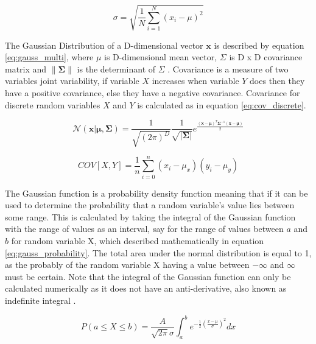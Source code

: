 \begin{equation}
  \sigma = \sqrt{\frac{1}{N}\sum_{i=1}^{N}(x_i - \mu)^2}
  \label{eq:standard_deviation}
\end{equation}

The Gaussian Distribution of a D-dimensional vector $\boldsymbol{x}$ is described by equation \ref{eq:gauss_multi}, where \textbf{$\mu$} is D-dimensional mean vector, \textbf{$\Sigma$} is D x D covariance matrix and $\|\boldsymbol{\Sigma}\|$ is the determinant of \textbf{$\Sigma$} \cite{patterns_machine_learning}. Covariance is a measure of two variables joint variability, if variable $X$ increases when variable $Y$ does then they have a positive covariance, else they have a negative covariance. Covariance for discrete random variables $X$ and $Y$ is calculated as in equation \ref{eq:cov_discrete}.

\begin{equation}
  \mathcal{N}(\boldsymbol{x}|\boldsymbol{\mu},\boldsymbol{\Sigma}) = \frac{1}{\sqrt{(2\pi)^D}}\frac{1}{\sqrt{|\boldsymbol{\Sigma}|}}e^{\frac{(\boldsymbol{x}-\boldsymbol{\mu})^T\boldsymbol{\Sigma}^{-1}(\boldsymbol{x}-\boldsymbol{\mu})}{2}}
\label{eq:gauss_multi}
\end{equation}

\begin{equation}
   COV[X,Y] = \frac{1}{n}\sum_{i = 0}^{n}(x_i - \mu_x)(y_i - \mu_y)
\label{eq:cov_discrete}
\end{equation}

The Gaussian function is a probability density function meaning that if it can be used to determine the probability that a random variable's value lies between some range. This is calculated by taking the integral of the Gaussian function with the range of values as an interval, say for the range of values between $a$ and $b$ for random variable X, which described mathematically in equation \ref{eq:gauss_probability}. The total area under the normal distribution is equal to 1, as the probably of the random variable X having a value between $-\infty$ and $\infty$ must be certain. Note that the integral of the Gaussian function can only be calculated numerically as it does not have an anti-derivative, also known as indefinite integral \cite{antiderivatives}. 

\begin{equation}
  P(a \leq X \leq b) = \frac{A}{\sqrt{2\pi}\sigma}\int_{a}^{b}e^{-\frac{1}{2}(\frac{x-\mu}{\sigma})^2}dx
\label{eq:gauss_probability}
\end{equation}


